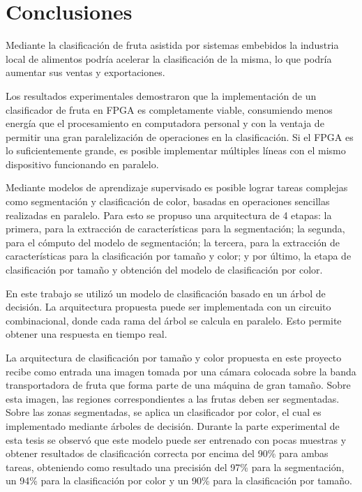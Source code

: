 \documentclass[twoside,spanish,ESP,MSc]{plantillaLabUPV}
\theoremstyle{definition}
\begin{document}

\chapter{Conclusiones}

Mediante la clasificación de fruta asistida por sistemas embebidos la industria local de alimentos podría acelerar la clasificación de la misma, lo que podría aumentar sus ventas y exportaciones.

Los resultados experimentales demostraron que la implementación de un clasificador de fruta en FPGA es completamente viable, consumiendo menos energía que el procesamiento en computadora personal y con la ventaja de permitir una gran paralelización de operaciones en la clasificación. Si el FPGA es lo suficientemente grande, es posible implementar múltiples líneas con el mismo dispositivo funcionando en paralelo.


Mediante modelos de aprendizaje supervisado es posible lograr tareas complejas como segmentación y clasificación de color, basadas en operaciones sencillas realizadas en paralelo. Para esto se propuso una arquitectura de 4 etapas: la primera, para la extracción de características para la segmentación; la segunda, para el cómputo del modelo de segmentación; la tercera, para la extracción de características para la clasificación por tamaño y color; y por último, la etapa de clasificación por tamaño y obtención del modelo de clasificación por color.

En este trabajo se utilizó un modelo de clasificación basado en un árbol de decisión. La arquitectura propuesta puede ser implementada con un circuito combinacional, donde cada rama del árbol se calcula en paralelo. Esto permite obtener una respuesta en tiempo real.

La arquitectura de clasificación por tamaño y color propuesta en este proyecto recibe como entrada una imagen tomada por una cámara colocada sobre la banda transportadora de fruta que forma parte de una máquina de gran tamaño. Sobre esta imagen, las regiones correspondientes a las frutas deben ser segmentadas. Sobre las zonas segmentadas, se aplica un clasificador por color, el cual es implementado mediante árboles de decisión. Durante la parte experimental de esta tesis se observó que este modelo puede ser entrenado con pocas muestras y obtener resultados de clasificación correcta por encima del 90\% para ambas tareas, obteniendo como resultado una precisión del 97\% para la segmentación, un 94\% para la clasificación por color y un 90\% para la clasificación por tamaño.
\end{document}
